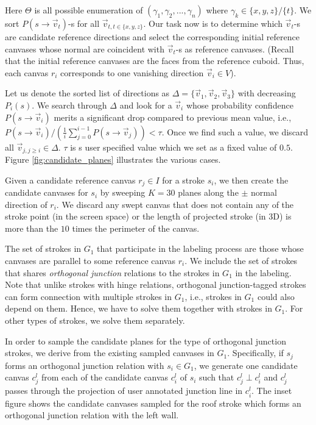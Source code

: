 Here $\Theta$ is all possible enumeration of $(\gamma_1,\gamma_2,...,\gamma_n)$ where $\gamma_k \in \{x,y,z\}/\{t\}$. We sort $P({s} \rightarrow \vec{v}_t)$-s for all $\vec{v}_{t, t \in \{x,y,z\}}$. Our task now is to determine which $\vec{v}_t$-s are candidate reference directions and select the corresponding initial reference canvases whose normal are coincident with $\vec{v}_t$-s as reference canvases. (Recall that the initial reference canvases are the faces from the reference cuboid. Thus, each canvas $r_i$ corresponds to one vanishing direction $\vec{v}_i \in V$).

Let us denote the sorted list of directions as $\Delta = \{\vec{v}_{1},\vec{v}_{2},\vec{v}_{3}\}$ with decreasing $P_i(s)$. We search through $\Delta$ and look for a $\vec{v}_i$ whose probability confidence $P(s \rightarrow \vec{v}_i)$ merits a significant drop compared to previous mean value, i.e., $P(s\rightarrow \vec{v}_i)/(\frac{1}{i}\sum_{j=0}^{i-1}P(s \rightarrow \vec{v}_{j})) < \tau$. Once we find such a value, we discard all $\vec{v}_{j, j \geq i} \in \Delta$. $\tau$ is s user specified value which we set as a fixed value of $0.5$. Figure \ref{fig:candidate_planes} illustrates the various cases.

Given a candidate reference canvas $r_j \in I$ for a stroke $s_i$, we then create the candidate canvases for $s_i$ by sweeping $K = 30$ planes along the $\pm$ normal direction of ${r_i}$. We discard any swept canvas that does not contain any of the stroke point (in the screen space) or the length of projected stroke (in 3{D}) is more than the $10$ times the perimeter of the canvas.

%
The set of strokes in $G_1$ that participate in the labeling process are those
whose canvases are parallel to some reference canvas $r_i$. We include the set of strokes that shares \emph{orthogonal junction} relations to the strokes in $G_1$ in the labeling. Note that unlike strokes with hinge relations, orthogonal junction-tagged strokes can form connection with multiple strokes in $G_1$, i.e., strokes in $G_1$ could also depend on them. Hence, we have to solve them together with strokes in $G_1$. For other types of strokes, we solve them separately.

In order to sample the candidate planes for the type of orthogonal junction strokes, we derive from the existing sampled canvases in $G_1$. Specifically, if $s_j$ forms an orthogonal junction relation with $s_i \in G_1$, we generate one candidate canvas $c_j^l$ from each of the candidate canvas $c_i^l$ of $s_i$ such that $c_j^l \perp c_i^l$ and $c_j^l$ passes through the projection of user annotated junction line in $c_i^l$. The inset figure shows the candidate canvases sampled for the roof stroke which forms an orthogonal junction relation with the left wall.

